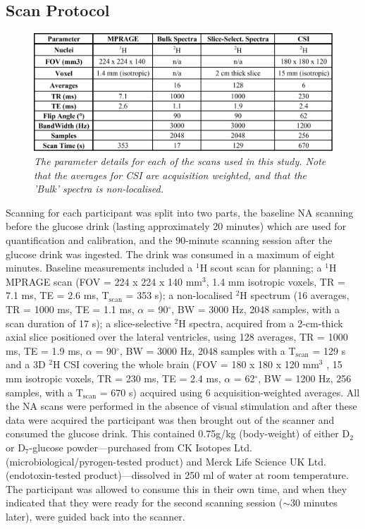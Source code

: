 \subsection{Scan Protocol}

\begin{figure}
    \centering
    \includegraphics[width = 1\textwidth]{Figures/Glucose/Scan_Details.png}
    \caption{\textit{The parameter details for each of the scans used in this study. Note that the averages for CSI are acquisition weighted, and that the 'Bulk' spectra is non-localised.}}
    \label{fig:Glu:Scan_Details}
\end{figure}

Scanning for each participant was split into two parts, the baseline \ac{NA} scanning before the glucose drink (lasting approximately 20 minutes) which are used for quantification and calibration, and the 90-minute scanning session after the glucose drink was ingested. The drink was consumed in a maximum of eight minutes. Baseline measurements included a $^1$H scout scan for planning; a $^1$H \ac{MPRAGE} scan (\ac{FOV} = 224 x 224 x 140 mm$^3$, 1.4 mm isotropic voxels, \ac{TR} = 7.1 ms, \ac{TE} = 2.6 ms, T$_\text{scan}$ = 353 s); a non-localised $^2$H spectrum (16 averages, \ac{TR} = 1000 ms, \ac{TE} = 1.1 ms, $\alpha$ = 90$^\circ$, \ac{BW} = 3000 Hz, 2048 samples, with a scan duration of 17 s); a slice-selective $^2$H spectra, acquired from a 2-cm-thick axial slice positioned over the lateral ventricles, using 128 averages, TR = 1000 ms, TE = 1.9 ms, $\alpha$ = 90$^\circ$, \ac{BW} = 3000 Hz,  2048 samples with a T$_\text{scan}$ = 129 s and a 3D $^2$H \ac{CSI} covering the whole brain (\ac{FOV} = 180 x 180 x 120 mm$^3$ , 15 mm isotropic voxels, \ac{TR} = 230 ms, \ac{TE} = 2.4 ms, $\alpha$ = 62$^\circ$, \ac{BW} = 1200 Hz, 256 samples, with a T$_\text{scan}$ = 670 s) acquired using 6 acquisition-weighted \cite{Pohmann2001AccurateCSI} averages. All the \ac{NA} scans were performed in the absence of visual stimulation and after these data were acquired the participant was then brought out of the scanner and consumed the glucose drink. This contained 0.75g/kg (body-weight) of either D$_2$ or D$_7$-glucose powder—purchased from CK Isotopes Ltd. (microbiological/pyrogen-tested product) and Merck Life Science UK Ltd. (endotoxin-tested product)—dissolved in 250 ml of water at room temperature. The participant was allowed to consume this in their own time, and when they indicated that they were ready for the second scanning session ($\sim$30 minutes later), were guided back into the scanner.

